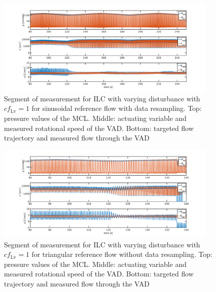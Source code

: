 \begin{figure}[ht!]
  \centering
  \includegraphics[width=0.95\textwidth]{images/chapt_5/ILC/ilc_var_dist_fix_sine.pdf}
  \caption[Segment of measurement for ILC with varying disturbance with $cf_{\mathrm{Lv}}=1$ for sinusoidal reference flow with data resampling]{Segment of measurement for ILC with varying disturbance with $cf_{\mathrm{Lv}}=1$ for sinusoidal reference flow with data resampling. Top:  pressure values of the MCL. Middle: actuating variable and measured rotational speed of the VAD. Bottom: targeted flow trajectory and measured flow through the VAD}
   \label{fig:anh_10}
\end{figure}

\begin{figure}[ht!]
  \centering
  \includegraphics[width=0.95\textwidth]{images/chapt_5/ILC/ilc_var_dist_unfix_triang.pdf}
  \caption[Segment of measurement for ILC with varying disturbance with $cf_{\mathrm{Lv}}=1$ for triangular reference flow without data resampling]{Segment of measurement for ILC with varying disturbance with $cf_{\mathrm{Lv}}=1$ for triangular reference flow without data resampling. Top:  pressure values of the MCL. Middle: actuating variable and measured rotational speed of the VAD. Bottom: targeted flow trajectory and measured flow through the VAD}
   \label{fig:anh_11}
\end{figure}

